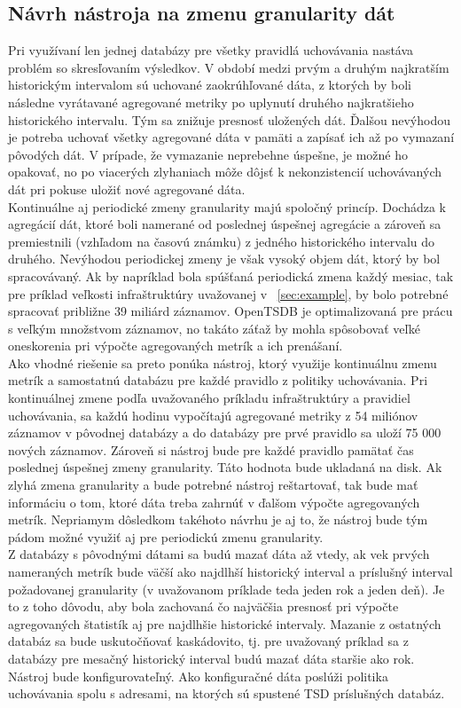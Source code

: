 \documentclass[12pt,twoside,color,cover,table]{fithesis3}
\begin{document}
\subsection{Návrh nástroja na  zmenu granularity dát}
Pri využívaní len jednej databázy pre všetky pravidlá uchovávania nastáva problém so skresľovaním výsledkov. V období medzi prvým a druhým najkratším historickým intervalom sú uchované zaokrúhľované dáta,
z ktorých by boli následne vyrátavané agregované metriky po uplynutí druhého najkratšieho historického intervalu. Tým sa znižuje presnosť uložených dát. Ďalšou nevýhodou je potreba uchovať všetky agregované 
dáta v pamäti a zapísať ich až po vymazaní pôvodých dát. V prípade, že vymazanie neprebehne úspešne, je možné ho opakovať, no po viacerých zlyhaniach môže dôjsť k nekonzistencií uchovávaných dát pri pokuse uložiť 
nové agregované dáta.
\\Kontinuálne aj periodické zmeny granularity majú spoločný princíp. Dochádza k agregácií dát, ktoré boli namerané od poslednej úspešnej agregácie a zároveň sa premiestnili (vzhľadom na časovú známku) z jedného
historického intervalu do druhého. Nevýhodou periodickej zmeny je však vysoký objem dát, ktorý by bol spracovávaný. Ak by napríklad bola spúšťaná periodická zmena každý mesiac, tak pre príklad veľkosti 
infraštruktúry uvažovanej v ~\ref{sec:example}, by bolo potrebné spracovať približne 39 miliárd záznamov. OpenTSDB je optimalizovaná pre prácu s veľkým množstvom záznamov, no takáto záťaž by mohla spôsobovať 
veľké oneskorenia pri výpočte agregovaných metrík a ich prenášaní.
\\Ako vhodné riešenie sa preto ponúka nástroj, ktorý využije kontinuálnu zmenu metrík a samostatnú databázu pre každé pravidlo z politiky uchovávania. Pri kontinuálnej zmene podľa uvažovaného príkladu 
infraštruktúry a pravidiel uchovávania, sa každú hodinu vypočítajú agregované metriky z 54 miliónov záznamov v pôvodnej databázy a do databázy pre prvé pravidlo sa uloží 75 000 nových záznamov. 
Zároveň si nástroj bude pre každé pravidlo pamätať čas poslednej úspešnej zmeny granularity. Táto hodnota bude ukladaná na disk. Ak zlyhá zmena granularity a bude potrebné nástroj reštartovať, 
tak bude mať informáciu o tom, ktoré dáta treba zahrnúť v ďalšom výpočte agregovaných metrík. Nepriamym dôsledkom takéhoto návrhu je aj to, že nástroj bude tým pádom možné využiť aj pre periodickú
zmenu granularity.
\\Z databázy s pôvodnými dátami sa budú mazať dáta až vtedy, ak vek prvých nameraných metrík bude väčší ako najdlhší historický interval a príslušný interval požadovanej granularity (v uvažovanom príklade 
teda jeden rok a jeden deň). Je to z toho dôvodu, aby bola zachovaná čo najväčšia presnosť pri výpočte agregovaných štatistík aj pre najdlhšie historické intervaly. Mazanie z ostatných databáz sa bude 
uskutočňovať kaskádovito, tj. pre uvažovaný príklad sa z databázy pre mesačný historický interval budú mazať dáta staršie ako rok.
\\Nástroj bude konfigurovateľný. Ako konfiguračné dáta poslúži politika uchovávania spolu s adresami, na ktorých sú spustené TSD príslušných databáz.
\end{document}

